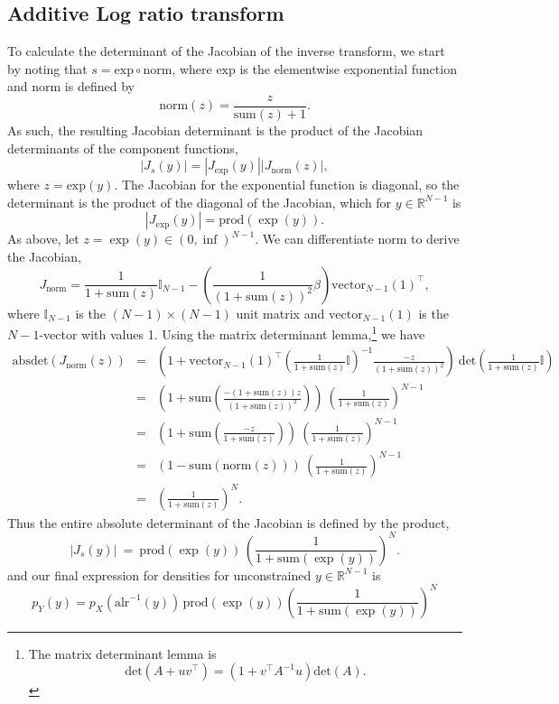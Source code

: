 \documentclass[11pt]{article}
\newcommand{\abs}[1]{\left| #1 \right|}
\newcommand{\absdet}[1]{\abs{#1}}
\begin{document}
\subsection{Additive Log ratio transform}
To calculate the determinant of the Jacobian of the inverse transform,
we start by noting that $s = \textrm{exp} \circ \textrm{norm}$, where
$\textrm{exp}$ is the elementwise exponential function and
\textrm{norm} is defined by
\[
  \textrm{norm}(z) = \frac{z}{\textrm{sum}(z) + 1}.
\]
As such, the resulting Jacobian determinant is the product of the
Jacobian determinants of the component functions,
\[
  \absdet{J_s(y)}
  = \absdet{J_{\textrm{exp}}(y)} \absdet{J_{\textrm{norm}}(z)},
\]
where $z = \textrm{exp}(y)$.  The Jacobian for the exponential
function is diagonal, so the determinant is the product of the
diagonal of the Jacobian, which for $y \in \mathbb{R}^{N-1}$ is
\[
  \absdet{J_{\textrm{exp}}(y)} = \textrm{prod}(\exp(y)).
\]
As above, let $z = \exp(y) \in (0, \inf)^{N-1}$.  We can differentiate
$\textrm{norm}$ to derive the Jacobian,
\[
  J_{\textrm{norm}}
  = \frac{1}{1 + \textrm{sum}(z)} \mathbb{I}_{N-1}
  - \left(\frac{1}{(1 + \textrm{sum}(z))^2} \beta \right)
  \textrm{vector}_{N-1}(1)^{\top},
\]
where $\mathbb{I}_{N-1}$ is the $(N - 1) \times (N - 1)$ unit matrix and
$\textrm{vector}_{N-1}(1)$ is the $N - 1$-vector with values 1.  Using
the matrix determinant lemma,\footnote{The matrix determinant lemma
  is \[\textrm{det}(A + u v^{\top}) = (1 + v^{\top} A^{-1} u)
    \textrm{det}(A).\]}
we have
\begin{eqnarray*}
  \textrm{absdet}(J_{\textrm{norm}}(z))
  & = &
  \left(
    1
    + \textrm{vector}_{N-1}(1)^{\top}
    \left(\frac{1}{1 + \textrm{sum}(z)} \mathbb{I} \right)^{-1}
    \frac{-z}{(1 + \textrm{sum}(z))^2}
    \right)
    \ \textrm{det}\left(\frac{1}{1 + \textrm{sum}(z)} \mathbb{I}
        \right)
  \\[6pt]
  & = &
  \left(
    1 
    + \textrm{sum}\left( \frac{-(1 + \textrm{sum}(z)) z}{(1 +
        \textrm{sum}(z))^2} \right)
  \right)
        \ \left( \frac{1}{1 + \textrm{sum}(z)} \right)^{N-1}
  \\[6pt]
  & = &
        \left(1 + \textrm{sum}\left(\frac{-z}{1 + \textrm{sum}(z)} \right)\right)        
        \ \left( \frac{1}{1 + \textrm{sum}(z)} \right)^{N-1}
  \\[6pt]
  & = & \left( 1 - \textrm{sum}(\textrm{norm}(z)) \right) 
        \ \left( \frac{1}{1 + \textrm{sum}(z)} \right)^{N-1}
  \\[6pt]
  & = & \left( \frac{1}{1 + \textrm{sum}(z)} \right)^N.
\end{eqnarray*}
Thus the entire absolute determinant of the Jacobian is defined by the
product, 
\[
  \absdet{J_s(y)}
  \ = \
  \textrm{prod}(\exp(y))
  \, \left( \frac{1}{1 + \textrm{sum}(\exp(y))} \right)^N.
\]
and our final expression for densities for unconstrained $y \in
\mathbb{R}^{N-1}$ is
\[
  p_Y(y)
  = p_X(\textrm{alr}^{-1}(y))
  \, \textrm{prod}(\exp(y))
  \left( \frac{1}{1 + \textrm{sum}(\exp(y))} \right)^N
\]  
\end{document}
